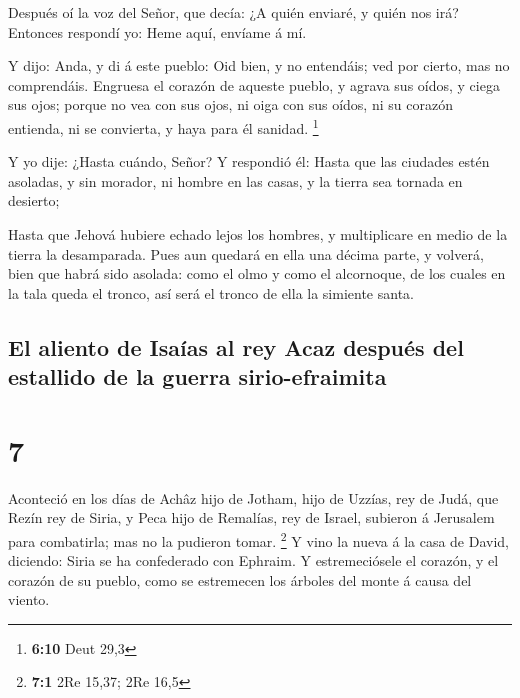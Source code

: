  Después oí la voz del Señor, que decía: ¿A quién enviaré,
y quién nos irá? Entonces respondí yo: Heme aquí, envíame á mí.

 Y dijo: Anda, y di á este pueblo: Oid bien, y no
entendáis; ved por cierto, mas no comprendáis.  Engruesa
el corazón de aqueste pueblo, y agrava sus oídos, y ciega sus ojos;
porque no vea con sus ojos, ni oiga con sus oídos, ni su corazón
entienda, ni se convierta, y haya para él sanidad. \footnote{\textbf{6:10}
  Deut 29,3}

 Y yo dije: ¿Hasta cuándo, Señor? Y respondió él: Hasta
que las ciudades estén asoladas, y sin morador, ni hombre en las casas,
y la tierra sea tornada en desierto;

 Hasta que Jehová hubiere echado lejos los hombres, y
multiplicare en medio de la tierra la desamparada.  Pues
aun quedará en ella una décima parte, y volverá, bien que habrá sido
asolada: como el olmo y como el alcornoque, de los cuales en la tala
queda el tronco, así será el tronco de ella la simiente santa.

\hypertarget{el-aliento-de-isauxedas-al-rey-acaz-despuuxe9s-del-estallido-de-la-guerra-sirio-efraimita}{%
\subsection{El aliento de Isaías al rey Acaz después del estallido de la
guerra
sirio-efraimita}\label{el-aliento-de-isauxedas-al-rey-acaz-despuuxe9s-del-estallido-de-la-guerra-sirio-efraimita}}

\hypertarget{section-6}{%
\section{7}\label{section-6}}

 Aconteció en los días de Achâz hijo de Jotham, hijo de
Uzzías, rey de Judá, que Rezín rey de Siria, y Peca hijo de Remalías,
rey de Israel, subieron á Jerusalem para combatirla; mas no la pudieron
tomar. \footnote{\textbf{7:1} 2Re 15,37; 2Re 16,5}  Y vino
la nueva á la casa de David, diciendo: Siria se ha confederado con
Ephraim. Y estremeciósele el corazón, y el corazón de su pueblo, como se
estremecen los árboles del monte á causa del viento.

